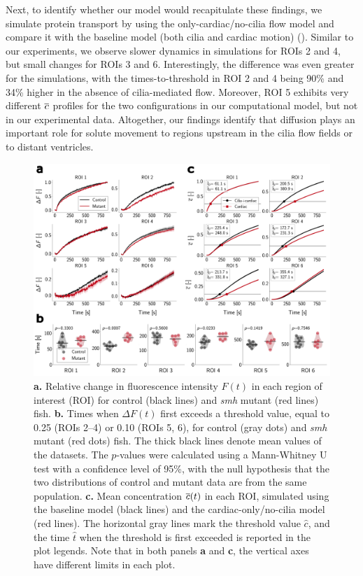 \documentclass{WileyMSP-template}
\begin{document}
Next, to identify whether our model would recapitulate these findings,
we simulate protein transport by using the only-cardiac/no-cilia flow model 
and compare it with the baseline model
(both cilia and cardiac motion) ().
Similar to our experiments, we observe slower dynamics in simulations for ROIs 2 and 4,
but small changes for ROIs 3 and 6.
Interestingly, the difference was even greater for the simulations,
with the times-to-threshold in ROI 2 and 4 being 90\% and 34\% higher
in the absence of cilia-mediated flow.
Moreover, ROI 5 exhibits very different $\overline{c}$ profiles for the two
configurations in our computational model,
but not in our experimental data.
Altogether, our findings identify that diffusion plays an important
role for solute movement to regions upstream in the cilia flow fields or to distant ventricles.
\begin{figure}[H]
    \centering
    \includegraphics[width=\textwidth]{graphics/figure4_compare_control_mutant.png}
    \caption{\textbf{a.} Relative change in fluorescence intensity $F(t)$
    in each region of interest (ROI) for control (black lines)
    and \emph{smh} mutant (red lines) fish. 
    \textbf{b.} Times when $\Delta F(t)$ first exceeds a threshold value,
    equal to 0.25 (ROIs 2--4) or 0.10 (ROIs 5, 6), for control (gray dots) and
    \emph{smh} mutant (red dots) fish.
    The thick black lines denote mean values of the datasets. The $p$-values
    were calculated using a Mann-Whitney U test with a confidence level of 95\%, with 
    the null hypothesis that the two distributions of control and mutant data are 
    from the same population.
    \textbf{c.} Mean concentration $\overline{c}(t)$ in each ROI,
    simulated using the baseline model (black lines) and the cardiac-only/no-cilia model (red lines).
    The horizontal gray lines mark the threshold value $\hat{c}$, and the time
    $\hat{t}$ when the threshold is first exceeded is reported in the plot legends.
    Note that in both panels \textbf{a} and \textbf{c}, the vertical axes have
    different limits in each plot.}
    \label{fig:fig4}
\end{figure}
\end{document}
